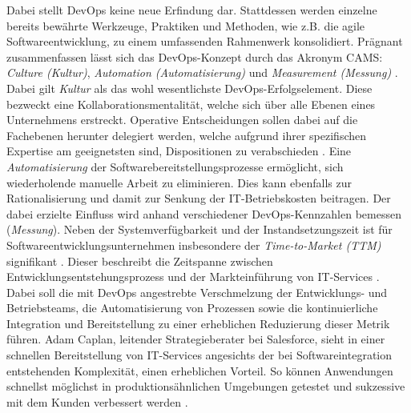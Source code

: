 Dabei stellt DevOps keine neue Erfindung dar. Stattdessen werden einzelne bereits bewährte Werkzeuge, Praktiken und Methoden, wie z.B. die agile Softwareentwicklung, zu einem umfassenden Rahmenwerk konsolidiert. Prägnant zusammenfassen lässt sich das DevOps-Konzept durch das Akronym CAMS: \textit{Culture (Kultur)}, \textit{Automation (Automatisierung)} und \textit{Measurement (Messung)} \cite[5]{Halstenberg.2020}. Dabei gilt \textit{Kultur} als das wohl wesentlichste DevOps-Erfolgselement. Diese bezweckt eine Kollaborationsmentalität, welche sich über alle Ebenen eines Unternehmens erstreckt. Operative Entscheidungen sollen dabei auf die Fachebenen herunter delegiert werden, welche aufgrund ihrer spezifischen Expertise am geeignetsten sind, Dispositionen zu verabschieden \cite[5]{Halstenberg.2020}. Eine \textit{Automatisierung} der Softwarebereitstellungsprozesse ermöglicht, sich wiederholende manuelle Arbeit zu eliminieren. Dies kann ebenfalls zur Rationalisierung und damit zur Senkung der IT-Betriebskosten beitragen. Der dabei erzielte Einfluss wird anhand verschiedener DevOps-Kennzahlen bemessen (\textit{Messung}). Neben der Systemverfügbarkeit und der Instandsetzungszeit ist für Softwareentwicklungsunternehmen insbesondere der \textit{Time-to-Market (\acs{TTM})} signifikant \cite[7]{Halstenberg.2020}. Dieser beschreibt die Zeitspanne zwischen Entwicklungsentstehungsprozess und der Markteinführung von IT-Services \cite[141]{Vesey.1992}. Dabei soll die mit DevOps angestrebte Verschmelzung der Entwicklungs- und Betriebsteams, die Automatisierung von Prozessen sowie die kontinuierliche Integration und Bereitstellung zu einer erheblichen Reduzierung dieser Metrik führen. Adam Caplan, leitender Strategieberater bei Salesforce, sieht in einer schnellen Bereitstellung von IT-Services angesichts der bei Softwareintegration entstehenden Komplexität, einen erheblichen Vorteil. So können Anwendungen schnellst möglichst in produktionsähnlichen Umgebungen getestet und sukzessive mit dem Kunden verbessert werden \cite{Vesey.1992}. 


